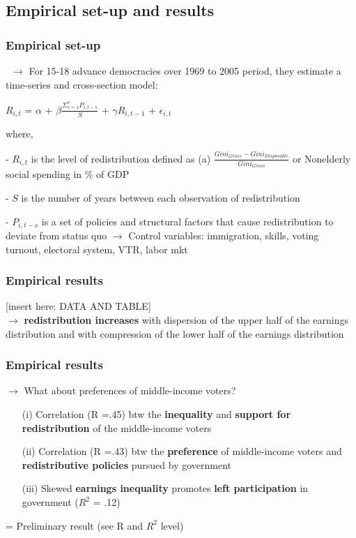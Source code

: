 \documentclass{beamer}
\begin{document}
\begin{frame}

\subsection{Empirical set-up and results}
\frametitle{Empirical set-up}\
$\longrightarrow$ For 15-18 advance democracies over 1969 to 2005 period, they estimate a time-series and cross-section model:\\
\begin{center}
$R_{i,t}$ = $\alpha$ + $\beta \frac{\Sigma ^{s} _{s=1}P_{i, t-s}}{S}$ + $\gamma R_{i, t-1}$ + $\epsilon_{i,t}$
\end{center}
where,
\begin{itemize}
\end{itemize}
\end{frame}

\begin{frame}
\frametitle{Empirical results}

[insert here: DATA AND TABLE]\\
\medskip
$\longrightarrow$ \textbf{redistribution increases} with dispersion of the upper half of the earnings distribution and with compression of the lower half of the earnings distribution

\end{frame}

\begin{frame}
\frametitle{Empirical results}
$\longrightarrow$  What about preferences of middle-income voters?
\medskip
\begin{itemize}
\item[(i)] Correlation (R =.45) btw the \textbf{inequality} and \textbf{support for redistribution} of the middle-income voters  
\item[(ii)] Correlation (R =.43)  btw the \textbf{preference} of middle-income voters and \textbf{redistributive policies} pursued by government
\item[(iii)] Skewed \textbf{earnings inequality} promotes \textbf{left participation} in government ($R^{2}$ = .12)
\end{itemize}
\medskip
\begin{center}
= Preliminary result (see R and $R^{2}$ level)\\
\end{center}
\end{frame}
\end{document}
